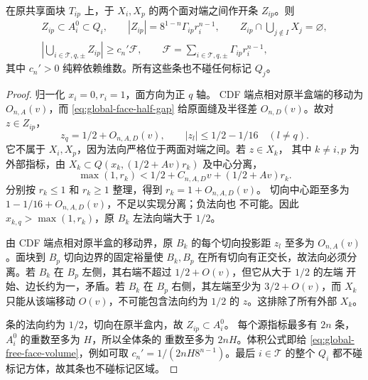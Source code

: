 \begin{lemma}\label{lem:global-free-face-strips}
在原共享面块 \(T_{ip}\) 上，于 \(X_i,X_p\) 的两个面对端之间作开条
\(Z_{ip}\)。则
\begin{gather}
 Z_{ip}\subset A_i^0\subset Q_i,\qquad
 |Z_{ip}|=8^{1-n}\Gamma_{ip}r_i^{n-1},\qquad
 Z_{ip}\cap\bigcup_{j\notin I}X_j=\varnothing,
 \label{eq:global-free-face-strip}\\
 \left|\bigcup_{i\in\mathcal T,q,\pm}Z_{ip}\right|
 \ge c_n'\mathcal F,\qquad
 \mathcal F=\sum_{i\in\mathcal T,q,\pm}\Gamma_{ip}r_i^{n-1},
 \label{eq:global-free-face-volume}
\end{gather}
其中 \(c_n'>0\) 纯粹依赖维数。所有这些条也不碰任何标记 \(Q_j\)。
\end{lemma}
\begin{proof}
归一化 \(x_i=0,r_i=1\)，面方向为正 \(q\) 轴。
CDF 端点相对原半盒端的移动为 \(O_{n,A}(v)\)，而
\eqref{eq:global-face-half-gap} 给原面缝及半径差 \(O_{n,D}(v)\)。故对
\(z\in Z_{ip}\)，
\[
 z_q=1/2+O_{n,A,D}(v),\qquad |z_l|\le1/2-1/16\quad(l\ne q).
\]
它不属于 \(X_i,X_p\)，因为法向严格位于两面对端之间。若 \(z\in X_k\)，
其中 \(k\ne i,p\) 为外部指标，由
\(X_k\subset Q(x_k,(1/2+Av)r_k)\) 及中心分离，
\[
 \max(1,r_k)<1/2+C_{n,A,D}v+(1/2+Av)r_k.
\]
分别按 \(r_k\le1\) 和 \(r_k\ge1\) 整理，得到 \(r_k=1+O_{n,A,D}(v)\)。
切向中心距至多为 \(1-1/16+O_{n,A,D}(v)\)，不足以实现分离；负法向也
不可能。因此 \(x_{k,q}>\max(1,r_k)\)，原 \(B_k\) 左法向端大于 \(1/2\)。

由 CDF 端点相对原半盒的移动界，原 \(B_k\) 的每个切向投影距 \(z_l\)
至多为 \(O_{n,A}(v)\)。面块到 \(B_p\) 切向边界的固定裕量使
\(B_k,B_p\) 在所有切向有正交长，故法向必须分离。若 \(B_k\) 在
\(B_p\) 左侧，其右端不超过 \(1/2+O(v)\)，但它从大于 \(1/2\) 的左端
开始、边长约为一，矛盾。若 \(B_k\) 在 \(B_p\) 右侧，其左端至少为
\(3/2+O(v)\)，而 \(X_k\) 只能从该端移动 \(O(v)\)，不可能包含法向约为
\(1/2\) 的 \(z\)。这排除了所有外部 \(X_k\)。

条的法向约为 \(1/2\)，切向在原半盒内，故 \(Z_{ip}\subset A_i^0\)。
每个源指标最多有 \(2n\) 条，\(A_i^0\) 的重数至多为 \(H\)，所以全体条的
重数至多为 \(2nH\)。体积公式即给
\eqref{eq:global-free-face-volume}，例如可取
\(c_n'=1/(2nH8^{n-1})\)。最后 \(i\in\mathcal T\) 的整个 \(Q_i\) 都不碰
标记方体，故其条也不碰标记区域。
\end{proof}

